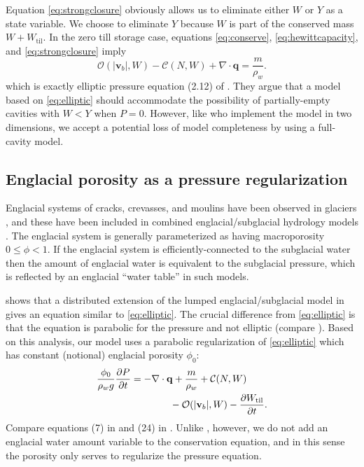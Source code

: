 \documentclass[gmd]{copernicus}   %
\begin{document}
Equation \eqref{eq:strongclosure} obviously allows us to eliminate either $W$ or $Y$ as a state variable.  We choose to eliminate $Y$ because $W$ is part of the conserved mass $W + W_{\text{til}}$.  In the zero till storage case, equations \eqref{eq:conserve}, \eqref{eq:hewittcapacity}, and \eqref{eq:strongclosure} imply
\begin{equation}
\mathcal{O}(|\mathbf{v}_b|,W) - \mathcal{C}(N,W) + \nabla\cdot\mathbf{q} = \frac{m}{\rho_w}. \label{eq:elliptic}
\end{equation}
which is exactly elliptic pressure equation (2.12) of \cite{Schoofetal2012}.  They argue that a model based on \eqref{eq:elliptic} should accommodate the possibility of partially-empty cavities with $W<Y$ when $P=0$.  However, like \cite{Werderetal2013} who implement the model in two dimensions, we accept a potential loss of model completeness by using a full-cavity model.

\subsection{Englacial porosity as a pressure regularization}  Englacial systems of cracks, crevasses, and moulins have been observed in glaciers \citep[for example]{Fountainetal2005,Bartholomausetal2008,Harperetal2010}, and these have been included in combined englacial/subglacial hydrology models \citep{FlowersClarke2002_theory,Bartholomausetal2011,Hewitt2013,Werderetal2013}.  The englacial system is generally parameterized as having macroporosity $0\le \phi < 1$.  If the englacial system is efficiently-connected to the subglacial water then the amount of englacial water is equivalent to the subglacial pressure, which is reflected by an englacial ``water table'' in such models.

\cite{Bueler2014correspondence} shows that a distributed extension of the lumped englacial/subglacial model in \cite{Bartholomausetal2011} gives an equation similar to \eqref{eq:elliptic}.  The crucial difference from \eqref{eq:elliptic} is that the equation is parabolic for the pressure and not elliptic (compare \cite{Hewittetal2012}).  Based on this analysis, our model uses a parabolic regularization of \eqref{eq:elliptic} which has constant (notional) englacial porosity $\phi_0$:
\begin{align}
\frac{\phi_0}{\rho_w g} \frac{\partial P}{\partial t} &= - \nabla\cdot \mathbf{q} + \frac{m}{\rho_w} + \mathcal{C}(N,W)  \label{eq:regpressureequation} \\
  &\qquad\qquad - \mathcal{O}(|\mathbf{v}_b|,W) - \frac{\partial W_{\text{til}}}{\partial t}. \notag
\end{align}
Compare equations (7) in \citep{Hewitt2013} and (24) in \citep{Werderetal2013}.  Unlike \cite{Werderetal2013}, however, we do not add an englacial water amount variable to the conservation equation, and in this sense the porosity only serves to regularize the pressure equation.
\end{document}

